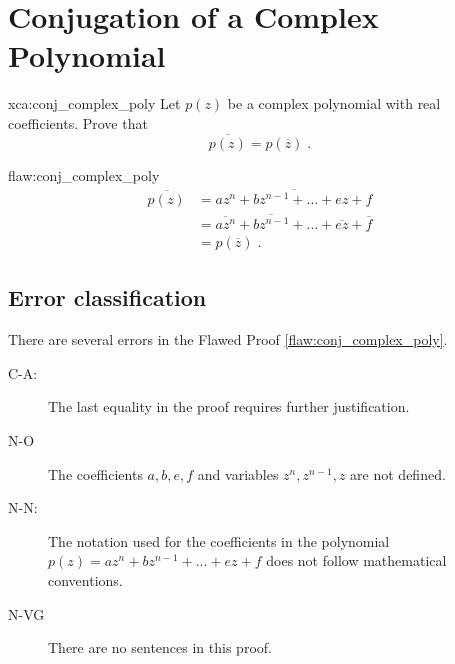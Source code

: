 \section{Conjugation of a Complex Polynomial}

\begin{xca}{xca:conj_complex_poly}
Let $p(z)$ be a complex polynomial with real coefficients.
Prove that $$\overline{p(z)} = p(\overline{z})\;.$$
\end{xca}

\begin{flaw}{flaw:conj_complex_poly} %
\begin{align*}
    \overline{p(z)} &= \overline{az^n + bz^{n-1} + ... + ez + f} \\
    &= \overline{az^n} + \overline{bz^{n-1}} + ... + \overline{ez} + \overline{f} \\
    &=p(\overline{z})\;.
\end{align*}
\end{flaw}

\clearpage
\subsection{Error classification}


There are several errors
 in the Flawed Proof \ref{flaw:conj_complex_poly}. %


 \begin{description}
 	\item[C-A:] The last equality in the proof requires further justification.
 \item[N-O] The coefficients $a,b,e,f$ and variables $z^n, z^{n-1}, z$ are not defined.
 	\item[N-N:] The notation used for the coefficients in the polynomial $p(z)=az^n + bz^{n-1} + ... + ez + f$ does not follow mathematical conventions.
 \item[N-VG] There are no sentences in this proof.
 \end{description}


